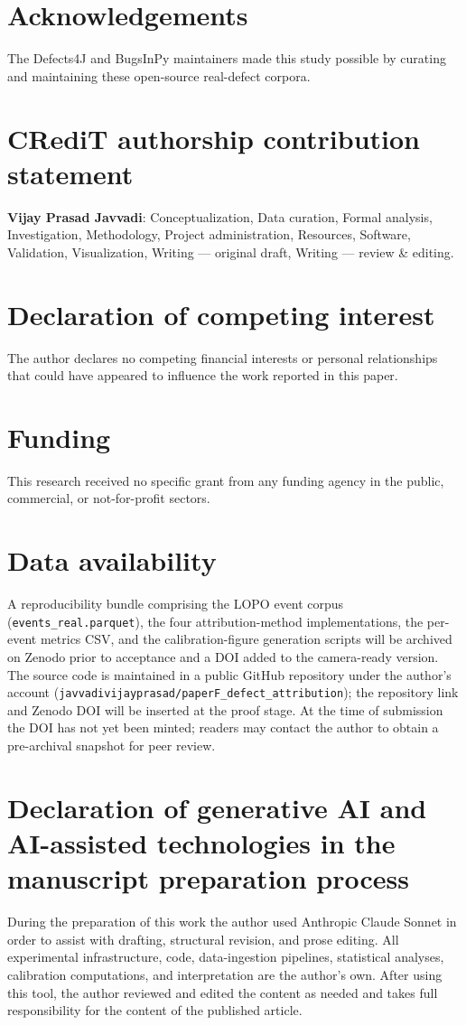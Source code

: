 \documentclass[preprint,12pt]{elsarticle}
\begin{document}
\section*{Acknowledgements}
The Defects4J and BugsInPy maintainers made this study possible by curating and maintaining these open-source real-defect corpora.

\section*{CRediT authorship contribution statement}
\textbf{Vijay Prasad Javvadi}: Conceptualization, Data curation,
Formal analysis, Investigation, Methodology, Project administration,
Resources, Software, Validation, Visualization, Writing --- original
draft, Writing --- review \& editing.

\section*{Declaration of competing interest}
The author declares no competing financial interests or personal
relationships that could have appeared to influence the work reported
in this paper.

\section*{Funding}
This research received no specific grant from any funding agency in
the public, commercial, or not-for-profit sectors.

\section*{Data availability}
A reproducibility bundle comprising the LOPO event corpus
(\texttt{events\_real.parquet}), the four attribution-method
implementations, the per-event metrics CSV, and the calibration-figure
generation scripts will be archived on Zenodo prior to acceptance and
a DOI added to the camera-ready version. The source code is maintained
in a public GitHub repository under the author's account
(\texttt{javvadivijayprasad/paperF\_defect\_attribution}); the
repository link and Zenodo DOI will be inserted at the proof stage. At
the time of submission the DOI has not yet been minted; readers may
contact the author to obtain a pre-archival snapshot for peer review.

\section*{Declaration of generative AI and AI-assisted technologies in the manuscript preparation process}
During the preparation of this work the author used Anthropic Claude
Sonnet in order to assist with drafting, structural revision, and
prose editing. All experimental infrastructure, code, data-ingestion
pipelines, statistical analyses, calibration computations, and
interpretation are the author's own. After using this tool, the author
reviewed and edited the content as needed and takes full
responsibility for the content of the published article.
\end{document}
